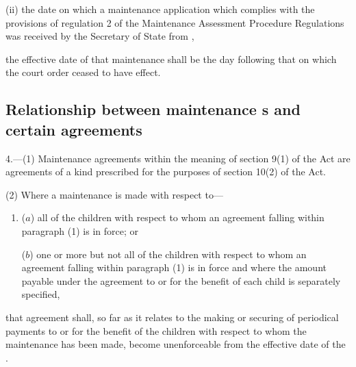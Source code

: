 \documentclass[12pt,a4paper]{article}
\begin{document}
{\begin{enumerate}
\begin{enumerate}
(ii) the date on which a maintenance application which complies with the provisions of regulation 2 of the Maintenance Assessment Procedure Regulations was received by the Secretary of State from ,
\end{enumerate}
\end{enumerate}
the effective date of that maintenance  shall be the day following that on which the court order ceased to have effect.}


\subsection[4. Relationship between maintenance \opt{oldrules}{assessment}\opt{newrules}{calculation}s and certain agreements]{\sloppy Relationship between maintenance s and certain agreements}

4.—(1) Maintenance agreements within the meaning of section 9(1) of the Act are agreements of a kind prescribed for the purposes of section 10(2) of the Act.

(2) Where a maintenance  is made with respect to—
\begin{enumerate}\item[]
($a$) all of the children with respect to whom an agreement falling within paragraph (1) is in force; or

($b$) one or more but not all of the children with respect to whom an agreement falling within paragraph (1) is in force and where the amount payable under the agreement to or for the benefit of each child is separately specified,
\end{enumerate}
that agreement shall, so far as it relates to the making or securing of periodical payments to or for the benefit of the children with respect to whom the maintenance  has been made, become unenforceable from the effective date of the .
\end{document}
